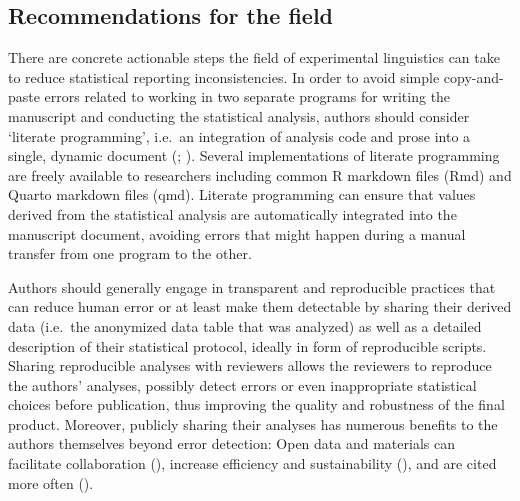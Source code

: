 \documentclass[
  doc,
  longtable,
  nolmodern,
  notxfonts,
  notimes,
  colorlinks=true,linkcolor=blue,citecolor=blue,urlcolor=blue]{apa7}
\begin{document}
\subsection{Recommendations for the
field}\label{recommendations-for-the-field}

There are concrete actionable steps the field of experimental
linguistics can take to reduce statistical reporting inconsistencies. In
order to avoid simple copy-and-paste errors related to working in two
separate programs for writing the manuscript and conducting the
statistical analysis, authors should consider `literate programming',
i.e.~an integration of analysis code and prose into a single, dynamic
document (;
). Several implementations
of literate programming are freely available to researchers including
common R markdown files (Rmd) and Quarto markdown files (qmd). Literate
programming can ensure that values derived from the statistical analysis
are automatically integrated into the manuscript document, avoiding
errors that might happen during a manual transfer from one program to
the other.

Authors should generally engage in transparent and reproducible
practices that can reduce human error or at least make them detectable
by sharing their derived data (i.e.~the anonymized data table that was
analyzed) as well as a detailed description of their statistical
protocol, ideally in form of reproducible scripts. Sharing reproducible
analyses with reviewers allows the reviewers to reproduce the authors'
analyses, possibly detect errors or even inappropriate statistical
choices before publication, thus improving the quality and robustness of
the final product. Moreover, publicly sharing their analyses has
numerous benefits to the authors themselves beyond error detection: Open
data and materials can facilitate collaboration
(), increase efficiency
and sustainability (), and are cited more often
().
\end{document}

